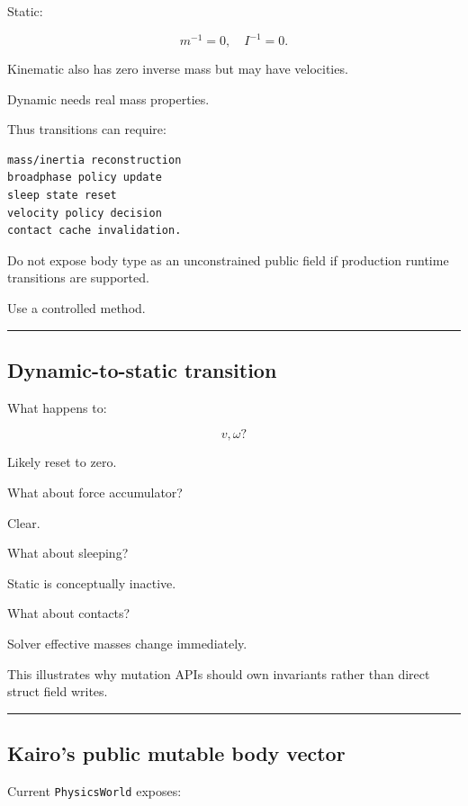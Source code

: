 Static:

\[
m^{-1}=0,\quad I^{-1}=0.
\]

Kinematic also has zero inverse mass but may have velocities.

Dynamic needs real mass properties.

Thus transitions can require:

\begin{verbatim}
mass/inertia reconstruction
broadphase policy update
sleep state reset
velocity policy decision
contact cache invalidation.
\end{verbatim}

Do not expose body type as an unconstrained public field if production runtime transitions are supported.

Use a controlled method.

\begin{center}\rule{0.5\linewidth}{0.5pt}\end{center}

\subsection{Dynamic-to-static transition}\label{06-engine-ii-ch038-dynamic-to-static-transition}

What happens to:

\[
v,\omega?
\]

Likely reset to zero.

What about force accumulator?

Clear.

What about sleeping?

Static is conceptually inactive.

What about contacts?

Solver effective masses change immediately.

This illustrates why mutation APIs should own invariants rather than direct struct field writes.

\begin{center}\rule{0.5\linewidth}{0.5pt}\end{center}

\subsection{Kairo's public mutable body vector}\label{06-engine-ii-ch038-kairos-public-mutable-body-vector}

Current \texttt{PhysicsWorld} exposes:

